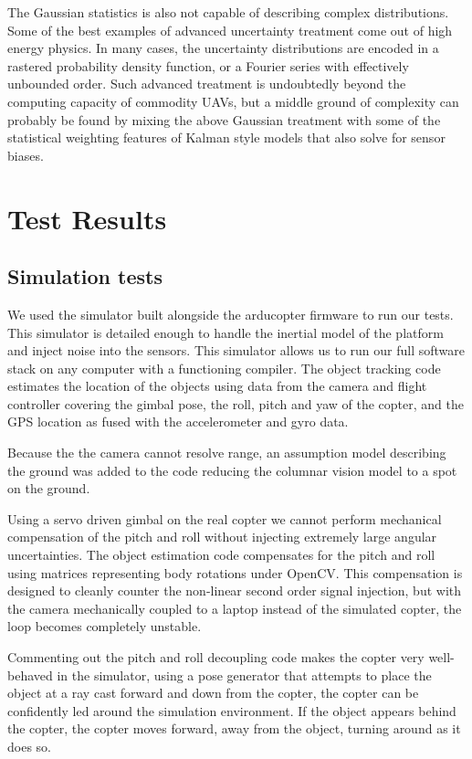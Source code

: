 \documentclass[a4paper, 11pt, titlepage]{article}
\begin{document}
      The Gaussian statistics is also not capable of describing complex distributions.  Some of the best examples of advanced uncertainty treatment come out of high energy physics.  In many cases, the uncertainty distributions are encoded in a rastered probability density function, or a Fourier series with effectively unbounded order.  Such advanced treatment is undoubtedly beyond the computing capacity of commodity UAVs, but a middle ground of complexity can probably be found by mixing the above Gaussian treatment with some of the statistical weighting features of Kalman style models that also solve for sensor biases.


\section{Test Results}

  \subsection{Simulation tests}
    We used the simulator built alongside the arducopter firmware to run our tests.  This simulator is detailed enough to handle the inertial model of the platform and inject noise into the sensors.
    This simulator allows us to run our full software stack on any computer with a functioning compiler.
    The object tracking code estimates the location of the objects using data from the camera and flight controller covering the gimbal pose, the roll, pitch and yaw of the copter, and the GPS location as fused with the accelerometer and gyro data.

    Because the the camera cannot resolve range, an assumption model describing the ground was added to the code reducing the columnar vision model to a spot on the ground.

    Using a servo driven gimbal on the real copter we cannot perform mechanical compensation of the pitch and roll without injecting extremely large angular uncertainties.
    The object estimation code compensates for the pitch and roll using matrices representing body rotations under OpenCV.
    This compensation is designed to cleanly counter the non-linear second order signal injection, but with the camera mechanically coupled to a laptop instead of the simulated copter, the loop becomes completely unstable.

    Commenting out the pitch and roll decoupling code makes the copter very well-behaved in the simulator, using a pose generator that attempts to place the object at a ray cast forward and down from the copter, the copter can be confidently led around the simulation environment.  If the object appears behind the copter, the copter moves forward, away from the object, turning around as it does so.
\end{document}
